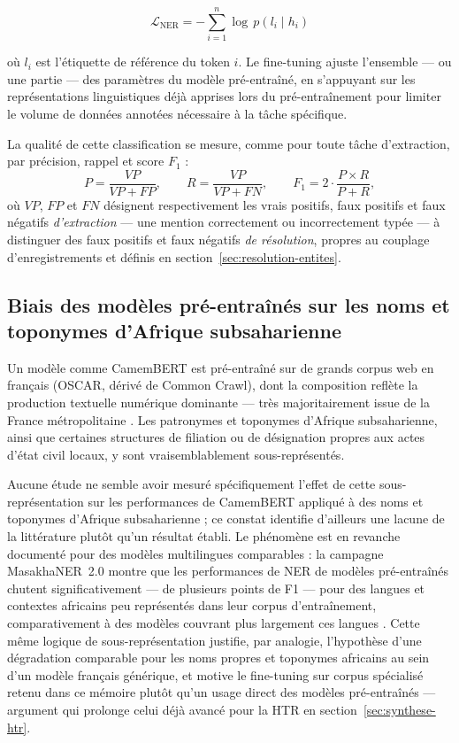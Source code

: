 \begin{equation}
    \mathcal{L}_{\mathrm{NER}} = -\sum_{i=1}^{n} \log\, p(l_i \mid h_i)
\end{equation}

où $l_i$ est l'étiquette de référence du token $i$.
Le fine-tuning ajuste l'ensemble --- ou une partie --- des paramètres du modèle pré-entraîné, en s'appuyant sur les représentations linguistiques déjà apprises lors du pré-entraînement pour limiter le volume de données annotées nécessaire à la tâche spécifique.

La qualité de cette classification se mesure, comme pour toute tâche d'extraction, par précision, rappel et score $F_1$ :
\begin{equation}
    P = \frac{VP}{VP+FP}, \qquad R = \frac{VP}{VP+FN}, \qquad F_1 = 2\cdot\frac{P\times R}{P+R},
\end{equation}
où $VP$, $FP$ et $FN$ désignent respectivement les vrais positifs, faux positifs et faux négatifs \emph{d'extraction} --- une mention correctement ou incorrectement typée --- à distinguer des faux positifs et faux négatifs \emph{de résolution}, propres au couplage d'enregistrements et définis en section~\ref{sec:resolution-entites}.

\subsection{Biais des modèles pré-entraînés sur les noms et toponymes d'Afrique subsaharienne}
\label{sec:biais-modeles}

Un modèle comme CamemBERT est pré-entraîné sur de grands corpus web en français (OSCAR, dérivé de Common Crawl), dont la composition reflète la production textuelle numérique dominante --- très majoritairement issue de la France métropolitaine \cite{martin2020camembert}.
Les patronymes et toponymes d'Afrique subsaharienne, ainsi que certaines structures de filiation ou de désignation propres aux actes d'état civil locaux, y sont vraisemblablement sous-représentés.

Aucune étude ne semble avoir mesuré spécifiquement l'effet de cette sous-représentation sur les performances de CamemBERT appliqué à des noms et toponymes d'Afrique subsaharienne ; ce constat identifie d'ailleurs une lacune de la littérature plutôt qu'un résultat établi.
Le phénomène est en revanche documenté pour des modèles multilingues comparables : la campagne MasakhaNER~2.0 montre que les performances de NER de modèles pré-entraînés chutent significativement --- de plusieurs points de F1 --- pour des langues et contextes africains peu représentés dans leur corpus d'entraînement, comparativement à des modèles couvrant plus largement ces langues \cite{adelani2022masakhaner}.
Cette même logique de sous-représentation justifie, par analogie, l'hypothèse d'une dégradation comparable pour les noms propres et toponymes africains au sein d'un modèle français générique, et motive le fine-tuning sur corpus spécialisé retenu dans ce mémoire plutôt qu'un usage direct des modèles pré-entraînés --- argument qui prolonge celui déjà avancé pour la HTR en section~\ref{sec:synthese-htr}.

